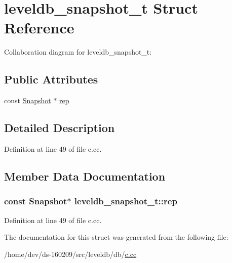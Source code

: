 \hypertarget{structleveldb__snapshot__t}{}\section{leveldb\+\_\+snapshot\+\_\+t Struct Reference}
\label{structleveldb__snapshot__t}


Collaboration diagram for leveldb\+\_\+snapshot\+\_\+t\+:
\subsection*{Public Attributes}
\begin{DoxyCompactItemize}
\item 
const \hyperlink{classleveldb_1_1_snapshot}{Snapshot} $\ast$ \hyperlink{structleveldb__snapshot__t_a36f57ffdcd88fa73322d8e2e637e3b6a}{rep}
\end{DoxyCompactItemize}


\subsection{Detailed Description}


Definition at line 49 of file c.\+cc.



\subsection{Member Data Documentation}
\hypertarget{structleveldb__snapshot__t_a36f57ffdcd88fa73322d8e2e637e3b6a}{}
\subsubsection[{rep}]{\setlength{\rightskip}{0pt plus 5cm}const {\bf Snapshot}$\ast$ leveldb\+\_\+snapshot\+\_\+t\+::rep}\label{structleveldb__snapshot__t_a36f57ffdcd88fa73322d8e2e637e3b6a}


Definition at line 49 of file c.\+cc.



The documentation for this struct was generated from the following file\+:\begin{DoxyCompactItemize}
\item 
/home/dev/ds-\/160209/src/leveldb/db/\hyperlink{c_8cc}{c.\+cc}\end{DoxyCompactItemize}
